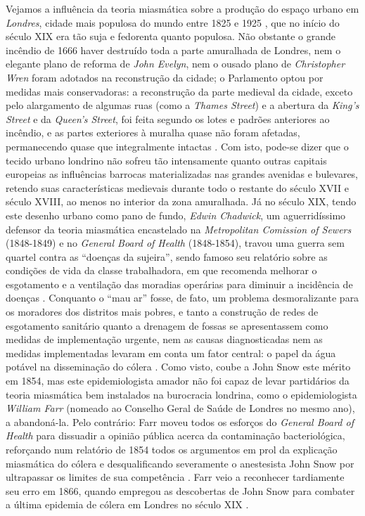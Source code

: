 Vejamos a influência da teoria miasmática sobre a produção do espaço urbano em \textit{Londres}, cidade mais populosa do mundo entre 1825 e 1925 \cite{morris_socdev_2010}, que no início do século XIX era tão suja e fedorenta quanto populosa. Não obstante o grande incêndio de 1666 haver destruído toda a parte amuralhada de Londres, nem o elegante plano de reforma de \textit{John Evelyn}, nem o ousado plano de \textit{Christopher Wren} foram adotados na reconstrução da cidade; o Parlamento optou por medidas mais conservadoras: a reconstrução da parte medieval da cidade, exceto pelo alargamento de algumas ruas (como a \textit{Thames Street}) e a abertura da \textit{King's Street} e da \textit{Queen's Street}, foi feita segundo os lotes e padrões anteriores ao incêndio, e as partes exteriores à muralha quase não foram afetadas, permanecendo quase que integralmente intactas \cite{peets_reblondon_1930,hanson_londonfire_1989}. Com isto, pode-se dizer que o tecido urbano londrino não sofreu tão intensamente quanto outras capitais europeias as influências barrocas materializadas nas grandes avenidas e bulevares, retendo suas características medievais durante todo o restante do século XVII e século XVIII, ao menos no interior da zona amuralhada. Já no século XIX, tendo este desenho urbano como pano de fundo, \textit{Edwin Chadwick}, um aguerridíssimo defensor da teoria miasmática encastelado na \textit{Metropolitan Comission of Sewers} (1848-1849) e no \textit{General Board of Health} (1848-1854), travou uma guerra sem quartel contra as ``doenças da sujeira'', sendo famoso seu relatório sobre as condições de vida da classe trabalhadora, em que recomenda melhorar o esgotamento e a ventilação das moradias operárias para diminuir a incidência de doenças \cite{chadwick_report_1842}. Conquanto o ``mau ar'' fosse, de fato, um problema desmoralizante para os moradores dos distritos mais pobres, e tanto a construção de redes de esgotamento sanitário quanto a drenagem de fossas se apresentassem como medidas de implementação urgente, nem as causas diagnosticadas nem as medidas implementadas levaram em conta um fator central: o papel da água potável na disseminação do cólera \cite[p.~84]{platt_landuse_2014}. Como visto, coube a John Snow este mérito em 1854, mas este epidemiologista amador não foi capaz de levar partidários da teoria miasmática bem instalados na burocracia londrina, como o epidemiologista \textit{William Farr} (nomeado ao Conselho Geral de Saúde de Londres no mesmo ano), a abandoná-la. Pelo contrário: Farr moveu todos os esforços do \textit{General Board of Health} para dissuadir a opinião pública acerca da contaminação bacteriológica, reforçando num relatório de 1854 todos os argumentos em prol da explicação miasmática do cólera e desqualificando severamente o anestesista John Snow por ultrapassar os limites de sua competência \cite{farr_report_1854}. Farr veio a reconhecer tardiamente seu erro em 1866, quando empregou as descobertas de John Snow para combater a última epidemia de cólera em Londres no século XIX \cite[p.~1.471]{halliday_miaslond_2001}. 

